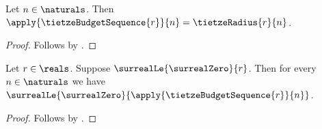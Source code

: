 \begin{proposition}\label{tietze_budget_sequence_apply}
    Let $n\in\naturals$.
    Then $\apply{\tietzeBudgetSequence{r}}{n}=\tietzeRadius{r}{n}$.
\end{proposition}
\begin{proof}
    Follows by
        .
\end{proof}

\begin{proposition}\label{tietze_budget_sequence_nonnegative}
    Let $r\in\reals$.
    Suppose $\surrealLe{\surrealZero}{r}$.
    Then for every $n\in\naturals$ we have
        $\surrealLe{\surrealZero}{\apply{\tietzeBudgetSequence{r}}{n}}$.
\end{proposition}
\begin{proof}
    Follows by
        .
\end{proof}

